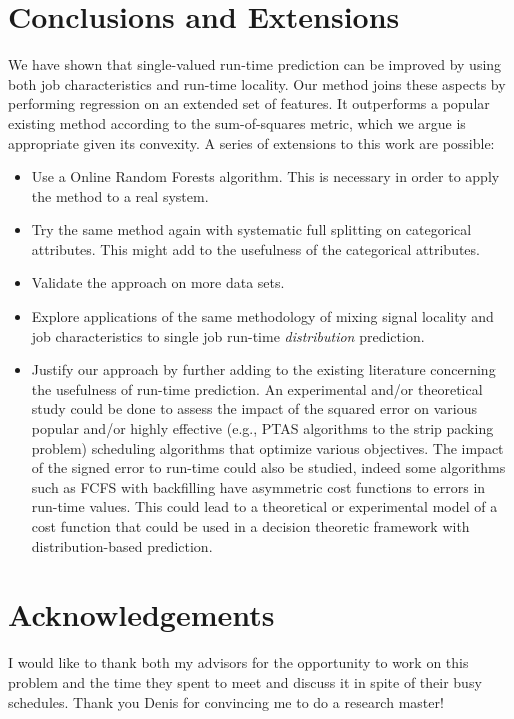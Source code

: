 \documentclass{article}
\begin{document}
\section{Conclusions and Extensions}
\label{sec:conclusions}
We have shown that single-valued run-time prediction can be improved by using both job characteristics and run-time locality. Our method joins these aspects by performing regression on an extended set of features. It outperforms a popular existing method according to the sum-of-squares metric, which we argue is appropriate given its convexity.
A series of extensions to this work are possible:
\begin{itemize}
  \item Use a Online Random Forests algorithm. This is necessary in order to apply the method to a real system.
  \item Try the same method again with systematic full splitting on categorical attributes. This might add to the usefulness of the categorical attributes.
  \item Validate the approach on more data sets.
  \item Explore applications of the same methodology of mixing signal locality and job characteristics to single job run-time \textit{distribution} prediction.
  \item Justify our approach by further adding to the existing literature concerning the usefulness of run-time prediction. An experimental and/or theoretical study could be done to assess the impact of the squared error on various popular and/or highly effective (e.g., PTAS algorithms to the strip packing problem) scheduling algorithms that optimize various objectives. The impact of the signed error to run-time could also be studied, indeed some algorithms such as FCFS with backfilling have asymmetric cost functions to errors in run-time values. This could lead to a theoretical or experimental model of a cost function that could be used in a decision theoretic framework with distribution-based prediction.
\end{itemize}

\section{Acknowledgements}
\label{sec:conclusions}
I would like to thank both my advisors for the opportunity to work on this problem and the time they spent to meet and discuss it in spite of their busy schedules. Thank you Denis for convincing me to do a research master!




\end{document}
